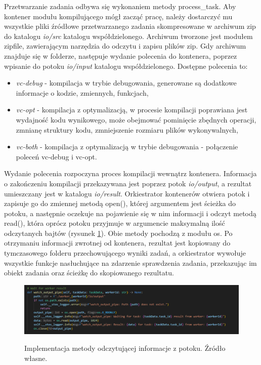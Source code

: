 Przetwarzanie zadania odbywa się wykonaniem metody process\_task. Aby kontener modułu kompilującego mógł zacząć pracę, należy dostarczyć mu wszystkie pliki źródłowe przetwarzanego zadania skompresowane w archiwum zip do katalogu \textit{io/src} katalogu współdzielonego. Archiwum tworzone jest modułem zipfile\cite{pythonZipfile}, zawierającym narzędzia do odczytu i zapisu plików zip. Gdy archiwum znajduje się w folderze, następuje wydanie polecenia do kontenera, poprzez wpisanie do potoku \textit{io/input} katalogu współdzielonego. Dostępne polecenia to:
\begin{itemize}
    \item \textit{vc-debug} - kompilacja w trybie debugowania, generowane są dodatkowe informacje o kodzie, zmiennych, funkcjach,
    \item \textit{vc-opt} - kompilacja z optymalizacją, w procesie kompilacji poprawiana jest wydajność kodu wynikowego, może obejmować pominięcie zbędnych operacji, zmnianę struktury kodu, zmniejszenie rozmiaru plików wykonywalnych,
    \item \textit{vc-both} - kompilacja z optymalizacją w trybie debugowania - połączenie poleceń vc-debug i vc-opt.
\end{itemize}
Wydanie polecenia rozpoczyna proces kompilacji wewnątrz kontenera. Informacja o zakończeniu kompilacji przekazywana jest poprzez potok \textit{io/output}, a rezultat umieszczany jest w katalogu \textit{io/result}. Orkiestrator kontenerów otwiera potok i zapisuje go do zmiennej metodą open(), której argumentem jest ścieżka do potoku, a następnie oczekuje na pojawienie się w nim informacji i odczyt metodą read(), która oprócz potoku przyjmuje w argumencie maksymalną ilość odczytanych bajtów (rysunek \ref{fig:scheduler-watch-pipe-impl}). Obie metody pochodzą z modułu os\cite{pytohnOs}. Po otrzymaniu informacji zwrotnej od kontenera, rezultat jest kopiowany do tymczasowego folderu przechowującego wyniki zadań, a orkiestrator wywołuje wszystkie funkcje nasłuchujące na zdarzenie sprawdzenia zadania, przekazując im obiekt zadania oraz ścieżkę do skopiowanego rezultatu.

\begin{figure}[!ht]
	\begin{center}
		\resizebox{1\textwidth}{!} {
			\includegraphics{img/3/orkiestrator-kontenerow-watch-output-pipe.png}
		}
		\caption{Implementacja metody odczytującej informacje z potoku. Źródło własne.}
		\label{fig:scheduler-watch-pipe-impl}
	\end{center}
\end{figure}

